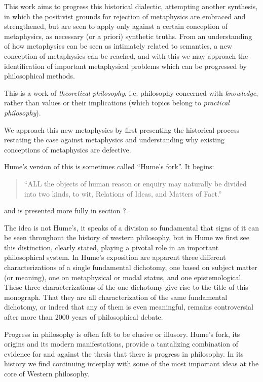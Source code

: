 This work aims to progress this historical dialectic, attempting another synthesis, in which the positivist grounds for rejection of metaphysics are embraced and strengthened, but are seen to apply only against a certain conception of metaphysics, as necessary (or a priori) synthetic truths.
From an understanding of how metaphysics can be seen as intimately related to semantics, a new conception of metaphysics can be reached, and with this we may approach the identification of important metaphysical problems  which can be progressed by philosophical methods.

This is a work of {\it theoretical philosophy}, i.e. philosophy concerned with {\it knowledge}, rather than values or their implications (which topics belong to {\it practical philosophy}).

We approach this new metaphysics by first presenting the historical process restating the case against metaphysics and understanding why existing conceptions of metaphysics are defective.

Hume's version of this is sometimes called ``Hume's fork''.
It begins:

\begin{quote}
``ALL the objects of human reason or enquiry may naturally be divided into two kinds, to wit, Relations of Ideas, and Matters of Fact.''
\end{quote}

and is presented more fully in section ?.

The idea is not Hume's, it speaks of a division so fundamental that signs of it can be seen throughout the history of western philosophy, but in Hume we first see this distinction, clearly stated, playing a pivotal role in an important philosophical system.
In Hume's exposition are apparent three different characterizations of a single fundamental dichotomy, one based on subject matter (or meaning), one on metaphysical or modal status, and one epistemological.
These three characterizations of the one dichotomy give rise to the title of this monograph.
That they are all characterization of the same fundamental dichotomy, or indeed that any of them is even meaningful, remains controversial after more than 2000 years of philosophical debate. 

Progress in philosophy is often felt to be elusive or illusory.
Hume's fork, its origins and its modern manifestations, provide a tantalizing combination of evidence for and against the thesis that there is progress in philosophy.
In its history we find continuing interplay with some of the most important ideas at the core of Western philosophy.

